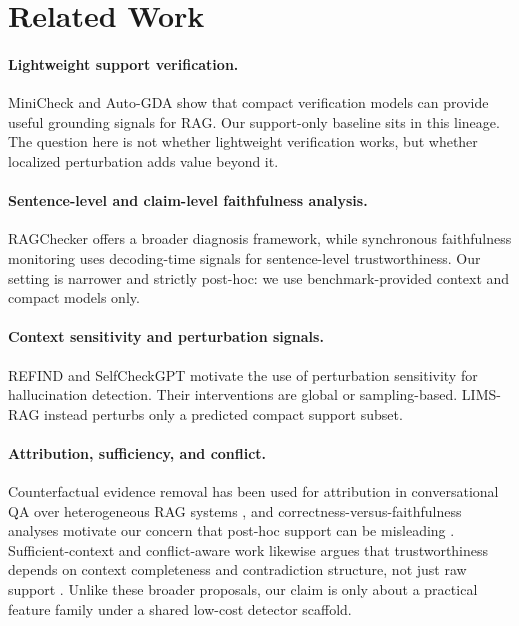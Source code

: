 \documentclass{article}
\begin{document}
\section{Related Work}
\label{sec:related}
\paragraph{Lightweight support verification.}
MiniCheck \citep{tang-etal-2024-minicheck} and Auto-GDA \citep{Leemann2025} show that compact verification models can provide useful grounding signals for RAG. Our support-only baseline sits in this lineage. The question here is not whether lightweight verification works, but whether localized perturbation adds value beyond it.

\paragraph{Sentence-level and claim-level faithfulness analysis.}
RAGChecker \citep{ru2024ragcheckerfinegrainedframeworkdiagnosing} offers a broader diagnosis framework, while synchronous faithfulness monitoring \citep{wu-etal-2024-synchronous} uses decoding-time signals for sentence-level trustworthiness. Our setting is narrower and strictly post-hoc: we use benchmark-provided context and compact models only.

\paragraph{Context sensitivity and perturbation signals.}
REFIND \citep{lee-yu-2025-refind} and SelfCheckGPT \citep{manakul-etal-2023-selfcheckgpt} motivate the use of perturbation sensitivity for hallucination detection. Their interventions are global or sampling-based. LIMS-RAG instead perturbs only a predicted compact support subset.

\paragraph{Attribution, sufficiency, and conflict.}
Counterfactual evidence removal has been used for attribution in conversational QA over heterogeneous RAG systems \citep{saharoy2025evidence}, and correctness-versus-faithfulness analyses motivate our concern that post-hoc support can be misleading \citep{wallat2024correctness}. Sufficient-context and conflict-aware work likewise argues that trustworthiness depends on context completeness and contradiction structure, not just raw support \citep{joren2024sufficient,zhang-etal-2025-faithfulrag}. Unlike these broader proposals, our claim is only about a practical feature family under a shared low-cost detector scaffold.
\end{document}
